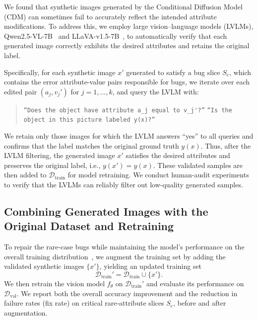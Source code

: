 \documentclass[10pt]{article} %
\newcommand{\qwen}{Qwen2.5-VL\xspace}
\newcommand{\llava}{LLaVA-v1.5\xspace}
\begin{document}
We found that synthetic images generated by the Conditional Diffusion Model (CDM) can sometimes fail to accurately reflect the intended attribute modifications. To address this, we employ large vision--language models (LVLMs), \qwen{}-7B~\citep{bai2025qwen25vl} and \llava{}-7B~\citep{liu2023improvedllava}, to automatically verify that each generated image correctly exhibits the desired attributes and retains the original label.

Specifically, for each synthetic image \(x'\) generated to satisfy a bug slice \(S_e\), which contains the error attribute-value pairs responsible for bugs, we iterate over each edited pair \((a_j, v_j')\) for \(j = 1, \dots, k\), and query the LVLM with: 
\vspace{-3pt}
\begin{quote}
\centering
\setlength{\parskip}{0pt}
\setlength{\parsep}{0pt}
\texttt{``Does the object have attribute \(a_j\) equal to \(v_j'\)?''} \newline
\texttt{``Is the object in this picture labeled \(y(x)\)?''}
\end{quote}

We retain only those images for which the LVLM answers “yes” to all queries and confirms that the label matches the original ground truth \(y(x)\). Thus, after the LVLM filtering, the generated image \(x'\) satisfies the desired attributes and preserves the original label, i.e., \(y(x') = y(x)\). These validated samples are then added to \(\mathcal{D}_{\mathrm{train}}\) for model retraining. We conduct human-audit experiments to verify that the LVLMs can reliably filter out low-quality generated samples.



\subsection{Combining Generated Images with the Original Dataset and Retraining}
To repair the rare-case bugs while maintaining the model's performance on the overall training distribution~\citep{lee2024genmix}, we augment the training set by adding the validated synthetic images \(\{x'\}\), yielding an updated training set 
\[
\mathcal{D}_{\mathrm{train}}' = \mathcal{D}_{\mathrm{train}} \cup \{x'\}.
\]
We then retrain the vision model \(f_\theta\) on \(\mathcal{D}_{\mathrm{train}}'\) and evaluate its performance on \(\mathcal{D}_{\mathrm{val}}\). We report both the overall accuracy improvement and the reduction in failure rates (fix rate) on critical rare‐attribute slices \(S_e\), before and after augmentation.
\end{document}

